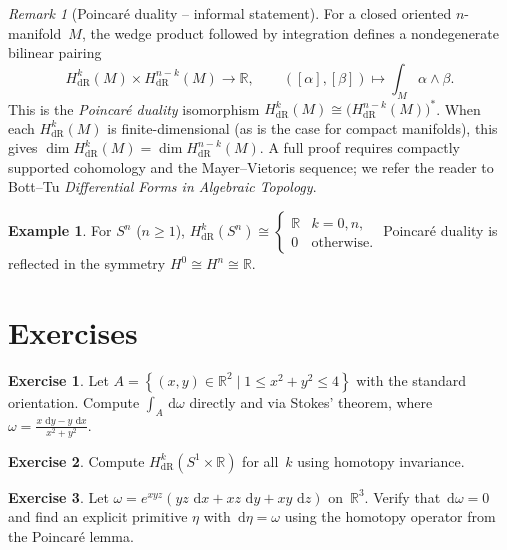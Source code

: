 \documentclass[12pt,a4paper,openany]{book}
\theoremstyle{definition}
\newtheorem{example}[theorem]{Example}
\newtheorem{exercise}{Exercise}[chapter]
\theoremstyle{remark}
\newtheorem{remark}[theorem]{Remark}
\newcommand{\R}{\mathbb{R}}
\newcommand{\dd}{\,\mathrm{d}}
\newcommand{\set}[1]{\left\{ #1 \right\}}
\begin{document}
\begin{remark}[Poincar\'e duality -- informal statement]
  \label{rem:poincare-duality}
For a closed oriented $n$-manifold~$M$, the wedge product followed by
integration defines a nondegenerate bilinear pairing
\[
  H^k_{\mathrm{dR}}(M) \times H^{n-k}_{\mathrm{dR}}(M) \longrightarrow \R,
  \qquad ([\alpha],[\beta])\longmapsto \int_M \alpha\wedge\beta.
\]
This is the \emph{Poincar\'e duality} isomorphism
$H^k_{\mathrm{dR}}(M)\cong \bigl(H^{n-k}_{\mathrm{dR}}(M)\bigr)^*$.
When each $H^k_{\mathrm{dR}}(M)$ is finite-dimensional (as is the case
for compact manifolds), this gives
$\dim H^k_{\mathrm{dR}}(M) = \dim H^{n-k}_{\mathrm{dR}}(M)$.
A full proof requires compactly supported cohomology and the
Mayer--Vietoris sequence; we refer the reader to Bott--Tu
\emph{Differential Forms in Algebraic Topology}.
\end{remark}

\begin{example}\label{ex:poincare-duality-sphere}
For $S^n$ ($n\ge 1$),
$H^k_{\mathrm{dR}}(S^n)\cong\begin{cases}\R & k=0,n,\\ 0 &
\text{otherwise.}\end{cases}$
Poincar\'e duality is reflected in the symmetry $H^0\cong H^n\cong\R$.
\end{example}

\section{Exercises}\label{sec:stokes-exercises}

\begin{exercise}\label{exo:stokes-annulus}
Let $A = \set{(x,y)\in\R^2 \mid 1\le x^2+y^2\le 4}$ with the
standard orientation.  Compute $\int_A \dd\omega$ directly and via
Stokes' theorem, where
$\omega = \frac{x\,\dd y - y\,\dd x}{x^2+y^2}$.
\end{exercise}

\begin{exercise}\label{exo:cohomology-cylinder}
Compute $H^k_{\mathrm{dR}}(S^1\times\R)$ for all~$k$ using homotopy
invariance.
\end{exercise}

\begin{exercise}\label{exo:poincare-explicit}
Let $\omega = e^{xyz}(yz\,\dd x + xz\,\dd y + xy\,\dd z)$ on~$\R^3$.
Verify that $\dd\omega = 0$ and find an explicit primitive $\eta$
with $\dd\eta = \omega$ using the homotopy operator from the Poincar\'e
lemma.
\end{exercise}
\end{document}
